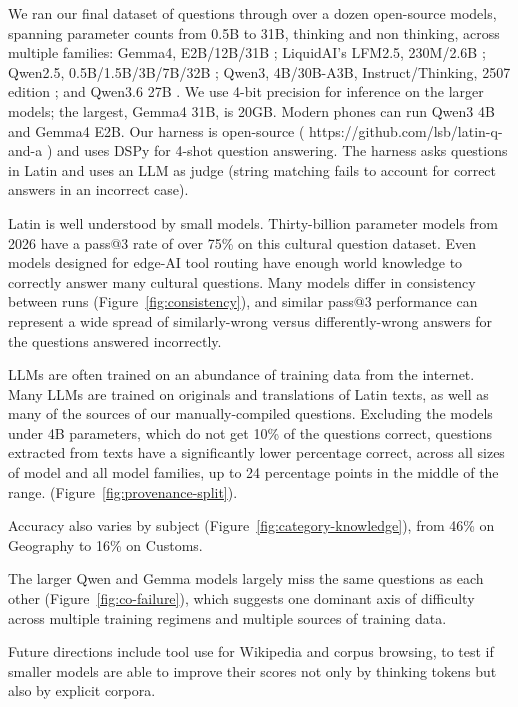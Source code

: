 \documentclass[11pt]{article}
\begin{document}
We ran our final dataset of questions through over a dozen open-source models, spanning parameter counts from 0.5B to 31B, thinking and non thinking, across multiple families: Gemma4, E2B/12B/31B \cite{gemmateam2026gemma4technicalreport,gemma4-e2b-weights,gemma4-12b-weights,gemma4-31b-weights}; LiquidAI's LFM2.5, 230M/2.6B \cite{lfm25-announcement,liquidai2025lfm2,lfm25-230m-gguf,lfm25-26b-gguf}; Qwen2.5, 0.5B/1.5B/3B/7B/32B \cite{qwen25-report,qwen25-collection}; Qwen3, 4B/30B-A3B, Instruct/Thinking, 2507 edition \cite{qwen3-techreport,qwen3-collection}; and Qwen3.6 27B \cite{qwen3.6-27b,qwen36-27b-weights}. We use 4-bit precision for inference on the larger models; the largest, Gemma4 31B, is 20GB. Modern phones can run Qwen3 4B and Gemma4 E2B. Our harness is open-source ( https://github.com/lsb/latin-q-and-a ) and uses DSPy for 4-shot question answering. The harness asks questions in Latin and uses an LLM as judge (string matching fails to account for correct answers in an incorrect case).

Latin is well understood by small models. Thirty-billion parameter models from 2026 have a pass@3 rate of over 75\% on this cultural question dataset. Even models designed for edge-AI tool routing have enough world knowledge to correctly answer many cultural questions. Many models differ in consistency between runs (Figure~\ref{fig:consistency}), and similar pass@3 performance can represent a wide spread of similarly-wrong versus differently-wrong answers for the questions answered incorrectly.

LLMs are often trained on an abundance of training data from the internet. Many LLMs are trained on originals and translations of Latin texts, as well as many of the sources of our manually-compiled questions. Excluding the models under 4B parameters, which do not get 10\% of the questions correct, questions extracted from texts have a significantly lower percentage correct, across all sizes of model and all model families, up to 24 percentage points in the middle of the range. (Figure~\ref{fig:provenance-split}).

Accuracy also varies by subject (Figure~\ref{fig:category-knowledge}), from 46\% on Geography to 16\% on Customs.

The larger Qwen and Gemma models largely miss the same questions as each other (Figure~\ref{fig:co-failure}), which suggests one dominant axis of difficulty across multiple training regimens and multiple sources of training data.

Future directions include tool use for Wikipedia and corpus browsing, to test if smaller models are able to improve their scores not only by thinking tokens but also by explicit corpora.
\end{document}

